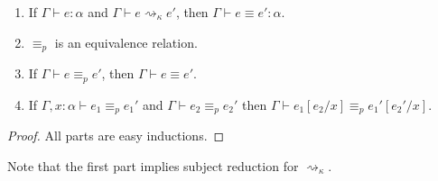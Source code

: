 \begin{lemma}
\begin{enumerate}
\item If $\Gamma\vdash e:\alpha$ and $\Gamma\vdash e\rightsquigarrow_\kappa e'$, then $\Gamma\vdash e\equiv e':\alpha$.
\item $\equiv_p$ is an equivalence relation.
\item If $\Gamma\vdash e\equiv_p e'$, then $\Gamma\vdash e\equiv e'$.
\item\label{item:p_subst} If $\Gamma,x:\alpha\vdash e_1\equiv_p e_1'$ and $\Gamma\vdash e_2\equiv_p e_2'$ then $\Gamma\vdash e_1[e_2/x]\equiv_p e_1'[e_2'/x]$.
\end{enumerate}
\end{lemma}
\begin{proof}
All parts are easy inductions.
\end{proof}
Note that the first part implies subject reduction for $\rightsquigarrow_\kappa$.

